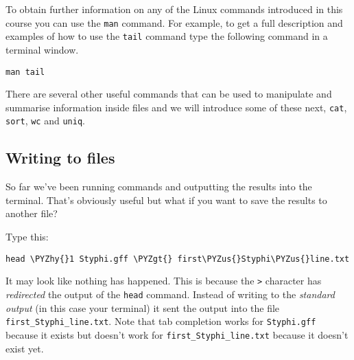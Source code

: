 \documentclass[11pt]{article}
\makeatletter
\def\PYZus{\char`\_}
\def\PYZgt{\char`\>}
\def\PYZhy{\char`\-}
\newcommand{\boxspacing}{\kern\kvtcb@left@rule\kern\kvtcb@boxsep}
\newcommand{\prompt}[4]{
        {\ttfamily\llap{{\color{blue}\LARGE\faKeyboardO\hspace{3pt}#4}}\vspace{-\baselineskip}}
    }
\makeatother
\begin{document}
To obtain further information on any of the Linux commands introduced in
this course you can use the \texttt{man} command. For example, to get a
full description and examples of how to use the \texttt{tail} command
type the following command in a terminal window.

    \begin{tcolorbox}[breakable, size=fbox, boxrule=1pt, pad at break*=1mm,colback=cellbackground, colframe=cellborder]
\prompt{In}{incolor}{ }{\boxspacing}
\begin{Verbatim}[commandchars=\\\{\}]
man tail
\end{Verbatim}
\end{tcolorbox}

    There are several other useful commands that can be used to manipulate
and summarise information inside files and we will introduce some of
these next, \texttt{cat}, \texttt{sort}, \texttt{wc} and \texttt{uniq}.

    \hypertarget{writing-to-files}{%
\subsection{Writing to files}\label{writing-to-files}}

So far we've been running commands and outputting the results into the
terminal. That's obviously useful but what if you want to save the
results to another file?

Type this:

    \begin{tcolorbox}[breakable, size=fbox, boxrule=1pt, pad at break*=1mm,colback=cellbackground, colframe=cellborder]
\prompt{In}{incolor}{ }{\boxspacing}
\begin{Verbatim}[commandchars=\\\{\}]
head \PYZhy{}1 Styphi.gff \PYZgt{} first\PYZus{}Styphi\PYZus{}line.txt
\end{Verbatim}
\end{tcolorbox}

    It may look like nothing has happened. This is because the
\texttt{\textgreater{}} character has \textit{redirected} the output of
the \texttt{head} command. Instead of writing to the \textit{standard
output} (in this case your terminal) it sent the output into the file
\texttt{first\_Styphi\_line.txt}. Note that tab completion works for
\texttt{Styphi.gff} because it exists but doesn't work for
\texttt{first\_Styphi\_line.txt} because it doesn't exist yet.
\end{document}
